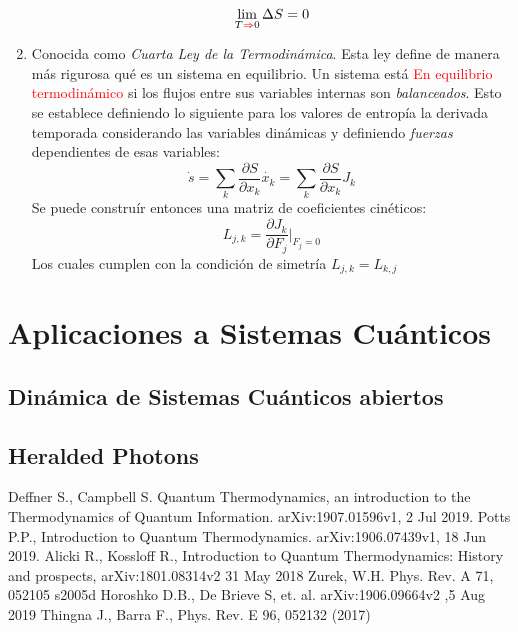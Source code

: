 \documentclass{book}
\begin{document}
\begin{enumerate}
    \begin{equation}\label{eq3.4c}{\lim_{T\textcolor{red}{\Rightarrow} 0} \Delta S=0}\end{equation}
    \item Conocida como \textit{Cuarta Ley de la Termodinámica}. Esta ley define de manera más rigurosa qué es un sistema en equilibrio. Un sistema está \textcolor{red}{En equilibrio termodinámico} si los flujos entre sus variables internas son \textit{balanceados}. Esto se establece definiendo lo siguiente para los valores de entropía la derivada temporada considerando las variables dinámicas y definiendo \textit{fuerzas} dependientes de esas variables: 
    \begin{equation}\label{eq3.5c}{\dot{s}=\sum_k\frac{\partial S}{\partial x_k}\dot{x_k}=\sum_k\frac{\partial S}{\partial x_k}J_k}\end{equation}
    Se puede construír entonces una matriz de coeficientes cinéticos:
    \begin{equation}\label{eq3.6c}{L_{j,k}=\frac{\partial J_k}{\partial F_j}\rvert_{F_j=0}}\end{equation}
    Los cuales cumplen con la condición de simetría ${L_{j,k}=L_{k,j}}$
\end{enumerate}

\section{Aplicaciones a Sistemas Cuánticos}
\subsection{Dinámica de Sistemas Cuánticos abiertos}
\subsection{Heralded Photons}
\begin{thebibliography}{9}
 Deffner S., Campbell S. Quantum Thermodynamics, an introduction to the Thermodynamics of Quantum Information. arXiv:1907.01596v1, 2 Jul 2019.
 Potts P.P., Introduction to Quantum Thermodynamics. arXiv:1906.07439v1, 18 Jun 2019.
 Alicki R., Kossloff R., Introduction to Quantum Thermodynamics: History and prospects, arXiv:1801.08314v2 31 May 2018
 Zurek, W.H. Phys. Rev. A 71, 052105 s2005d
 Horoshko D.B., De Brieve S, et. al. arXiv:1906.09664v2 ,5 Aug 2019
 Thingna J., Barra F., Phys. Rev. E 96, 052132 (2017)
\end{thebibliography}
\end{document}

